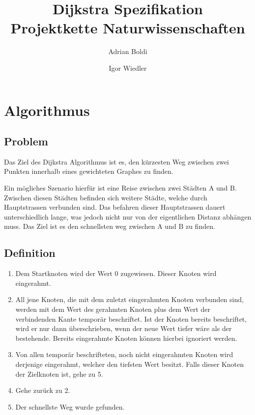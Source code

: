 \documentclass[a4paper,titlepage]{article}
\title{Dijkstra Spezifikation\\Projektkette Naturwissenschaften}
\author{Adrian Boldi \and Igor Wiedler}
\begin{document}
\maketitle

\tableofcontents

\newpage

\section{Algorithmus}

\subsection{Problem}

Das Ziel des Dijkstra Algorithmus ist es, den kürzesten Weg zwischen zwei Punkten innerhalb eines gewichteten Graphes zu finden.

Ein mögliches Szenario hierfür ist eine Reise zwischen zwei Städten A und B. Zwischen diesen Städten befinden sich weitere Städte, welche durch Hauptstrassen verbunden sind. Das befahren dieser Hauptstrassen dauert unterschiedlich lange, was jedoch nicht nur von der eigentlichen Distanz abhängen muss. Das Ziel ist es den schnellsten weg zwischen A und B zu finden.

\subsection{Definition}

\begin{enumerate}
\item Dem Startknoten wird der Wert 0 zugewiesen. Dieser Knoten wird eingerahmt.
\item All jene Knoten, die mit dem zuletzt eingerahmten Knoten verbunden sind, werden mit dem Wert des gerahmten Knoten plus dem Wert der verbindenden Kante temporär beschriftet. Ist der Knoten bereits beschriftet, wird er nur dann überschrieben, wenn der neue Wert tiefer wäre als der bestehende. Bereits eingerahmte Knoten können hierbei ignoriert werden.
\item Von allen temporär beschrifteten, noch nicht eingerahmten Knoten wird derjenige eingerahmt, welcher den tiefsten Wert besitzt. Falls dieser Knoten der Zielknoten ist, gehe zu 5.
\item Gehe zurück zu 2.
\item Der schnellste Weg wurde gefunden.
\end{enumerate}
\end{document}
